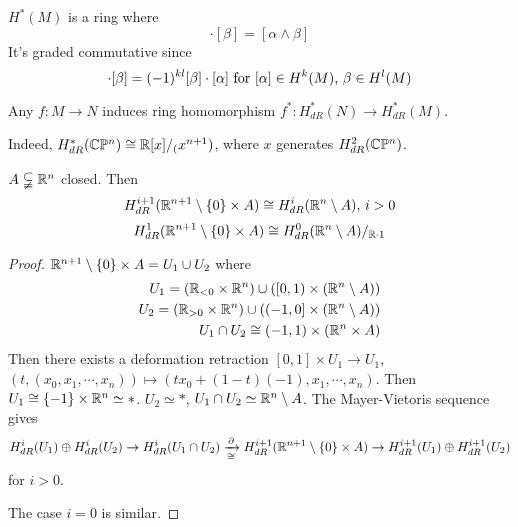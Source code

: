 \begin{remark}
     $ H^*(M ) $ is a ring where 
     \begin{equation}
        [\alpha]\cdot[\beta]=[\alpha\wedge \beta]
     \end{equation}
    It's graded commutative since 
    \begin{equation}
        [\alpha]\cdot[\beta]=(-1)^{kl}[\beta]\cdot[\alpha]\text{ for  $ [\alpha]\in H^k(M) $, $ \beta\in H^{l}(M) $}
    \end{equation}
    
    Any  $ f:M\rightarrow N     $ induces ring homomorphism  $ f^*:H^*_{dR}(N)\rightarrow H^*_{dR}(M) $.

    Indeed,  $ H_{dR}^*(\mathbb C\mathbb P^n)\cong\mathbb R[x]/_(x^{n+1}) $, where $ x  $ generates  $ H_{dR}^2(\mathbb C\mathbb P^n) $.
\end{remark}

\begin{proposition}\label{inductive prop in de-rham}
     $ A\subsetneqq \mathbb R^n $ closed. Then 
     \begin{equation}
        H_{dR}^{i+1}(\mathbb R^{n+1}\setminus\{0\}\times A)\cong H^i_{dR}(\mathbb R^n\setminus A),\, i>0
     \end{equation}
     \begin{equation}
        H^1_{dR}(\mathbb R^{n+1}\setminus\{0\}\times A)\cong H_{dR}^0(\mathbb R^n\setminus A)/_{\mathbb R\cdot 1}
     \end{equation}
\end{proposition}
\begin{proof}
     $ \mathbb R^{n+1}\setminus\{0\}\times A=U_1\cup U_2 $ where 
     \begin{equation*}
        \begin{aligned}
            U_1=(\mathbb R_{<0}\times \mathbb R^n)\cup ([0,1)\times(\mathbb R^n\setminus A))\\
            U_2=(\mathbb R_{>0}\times \mathbb R^n)\cup((-1,0]\times(\mathbb R^n\setminus A))\\
            U_1\cap U_2\cong (-1,1)\times (\mathbb R^n\times A)
        \end{aligned}
     \end{equation*} 
     Then there exists a deformation retraction  $ [0,1]\times U_1\rightarrow U_1 $, $ (t,(x_0,x_1,\cdots,x_n))\mapsto (tx_0+(1-t)(-1),x_1,\cdots,x_n)  $. Then  $ U_1\cong\{-1\}\times \mathbb R^n\simeq * $.  $ U_2\simeq * $,  $ U_1\cap U_2\simeq \mathbb R^n\setminus A $. The Mayer-Vietoris sequence gives 
 \begin{equation*}
   H^i_{dR}(U_1)\oplus H_{dR}^i(U_2)\rightarrow H_{dR}^i(U_1\cap U_2)\xrightarrow[\cong]{\partial}H_{dR}^{i+1}(\mathbb R^{n+1}\setminus\{0\}\times A)\rightarrow H_{dR}^{i+1}(U_1)\oplus H_{dR}^{i+1}(U_2)
 \end{equation*} 
for  $ i>0 $. 

The case  $ i=0 $ is similar. 
\end{proof}


